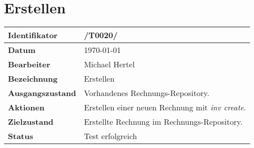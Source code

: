 
\section{Erstellen}

\renewcommand{\arraystretch}{1.5}

\begin{center}
 \begin{tabular}{|p{}|p{}|}
	\hline
	\textbf{Identifikator}  & /T0020/ \\
	\hline
	\textbf{Datum} & \today \\
	\hline
	\textbf{Bearbeiter} & Michael Hertel \\
	\hline
	\textbf{Bezeichnung} & Erstellen \\
	\hline
	\textbf{Ausgangszustand} & 
		Vorhandenes Rechnungs-Repository. \\
	\hline
	\textbf{Aktionen} & 
		Erstellen einer neuen Rechnung mit \textit{inv create}. \\
	\hline
	\textbf{Zielzustand} & 
		Erstellte Rechnung im Rechnungs-Repository. \\
	\hline
	\textbf{Status} & Test erfolgreich \\
	\hline
 \end{tabular}
\end{center}

